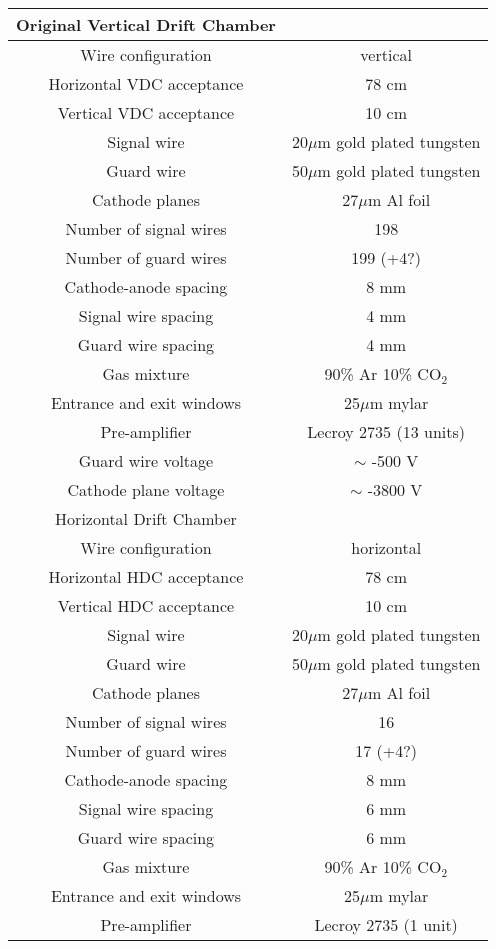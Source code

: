 \documentclass[11pt]{report}
\begin{document}
\begin{table}[!ht]
\centering
\begin{tabular}{c|c}
\hline
\hline
Original Vertical Drift Chamber & \\
\hline
Wire configuration & vertical\\
Horizontal VDC acceptance & 78 cm\\
Vertical VDC acceptance & 10 cm\\
Signal wire &  20$\mu$m gold plated tungsten\\
Guard wire &  50$\mu$m gold plated tungsten\\
Cathode planes &  27$\mu$m Al foil\\
Number of signal wires & 198 \\
Number of guard wires & 199 (+4?)\\
Cathode-anode spacing & 8 mm\\
Signal wire spacing & 4 mm\\
Guard wire spacing & 4 mm\\
Gas mixture & 90\% Ar 10\% CO$_2$\\
Entrance and exit windows & 25$\mu$m mylar\\
Pre-amplifier & Lecroy 2735 (13 units)\\
Guard wire voltage & $\sim$ -500 V\\
Cathode plane voltage & $\sim$ -3800 V\\
\hline
\hline
Horizontal Drift Chamber & \\
\hline
Wire configuration & horizontal\\
Horizontal HDC acceptance & 78 cm\\
Vertical HDC acceptance & 10 cm\\
Signal wire &  20$\mu$m gold plated tungsten \\
Guard wire & 50$\mu$m gold plated tungsten\\
Cathode planes &  27$\mu$m Al foil\\
Number of signal wires & 16\\
Number of guard wires & 17 (+4?)\\
Cathode-anode spacing & 8 mm\\
Signal wire spacing & 6 mm\\
Guard wire spacing & 6 mm\\
Gas mixture & 90\% Ar 10\% CO$_2$\\
Entrance and exit windows & 25$\mu$m mylar\\
Pre-amplifier & Lecroy 2735 (1 unit)\\

\end{tabular}
\end{table}
\end{document}
